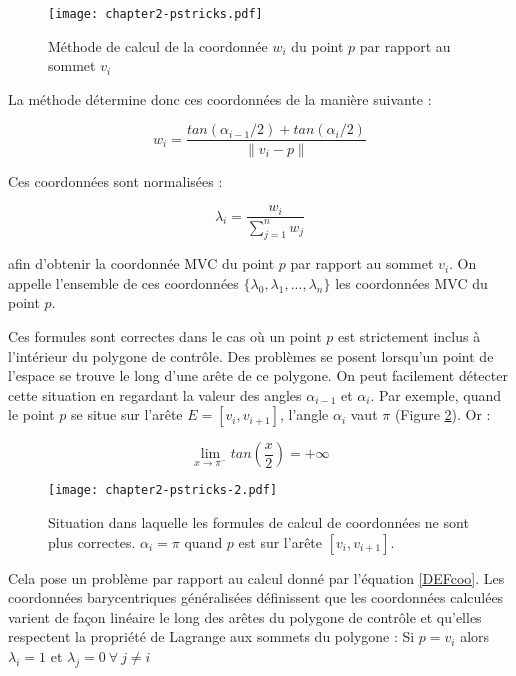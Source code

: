 \begin{figure}[ht]
  \begin{center}
    \texttt{[image: chapter2-pstricks.pdf]}
    \caption{Méthode de calcul de la coordonnée $w_i$ du point $p$ par rapport
    au sommet $v_i$}
    \label{DEFcal}
  \end{center}
\end{figure}

La méthode détermine donc ces coordonnées de la manière suivante :

\begin{equation}
  w_i = \frac{tan(\alpha_{i-1}/2) + tan(\alpha_i/2)}{\| v_i - p \|}
  \label{DEFcoo}
\end{equation}

Ces coordonnées sont normalisées :

\begin{equation}
  \lambda_i = \frac{w_i}{\sum_{j=1}^n w_j}
\end{equation}

afin d'obtenir la coordonnée MVC du point $p$ par rapport au sommet $v_i$. On
appelle l'ensemble de ces coordonnées $\{\lambda_0, \lambda_1, ...,
\lambda_n\}$ les coordonnées MVC du point $p$.

Ces formules sont correctes dans le cas où un point $p$ est strictement inclus
à l'intérieur du polygone de contrôle. Des problèmes se posent lorsqu'un point
de l'espace se trouve le long d'une arête de ce polygone. On peut facilement
détecter cette situation en regardant la valeur des angles $\alpha_{i-1}$ et
$\alpha_i$. Par exemple, quand le point $p$ se situe sur l'arête $E =
[v_i,v_{i+1}]$, l'angle $\alpha_i$ vaut $\pi$ (Figure \ref{DEFinc}). Or :

\begin{displaymath}
  \lim\limits_{x \to \pi^-} tan(\frac{x}{2}) = +\infty
\end{displaymath}

\begin{figure}[ht]
  \begin{center}
    \texttt{[image: chapter2-pstricks-2.pdf]}
    \caption{Situation dans laquelle les formules de calcul de coordonnées ne
    sont plus correctes. $\alpha_i = \pi$ quand $p$ est sur l'arête
    $[v_i,v_{i+1}]$.}
    \label{DEFinc}
  \end{center}
\end{figure}

Cela pose un problème par rapport au calcul donné par l'équation \ref{DEFcoo}.
Les coordonnées barycentriques généralisées définissent que les coordonnées
calculées varient de façon linéaire le long des arêtes du polygone de contrôle
et qu'elles respectent la propriété de Lagrange aux sommets du polygone : Si $p
= v_i$ alors $\lambda_i = 1$ et $\lambda_j = 0 ~\forall~ j \neq i$ 

